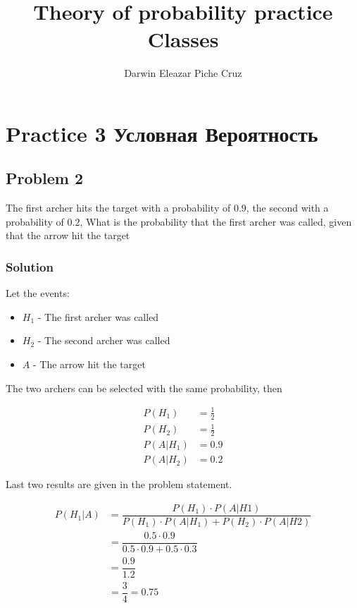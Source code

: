 \documentclass{article}
\title{Theory of probability practice Classes}
\author{Darwin Eleazar Piche Cruz}
\begin{document}
\maketitle

\section*{Practice 3 Условная Вероятность}

\subsection*{Problem 2}

The first archer hits the target with a probability of $0.9$, the second with a probability of $0.2$, What is the probability that the first archer was called, given that the arrow hit the target

\subsubsection*{Solution}

Let the events:

\begin{itemize}
    \item $H_1$ - The first archer was called
    \item $H_2$ - The second archer was called
    \item $A$ - The arrow hit the target
\end{itemize}

The two archers can be selected with the same probability, then

\begin{align*}
    P(H_1) &= \frac{1}{2} \\
    P(H_2) &= \frac{1}{2} \\
    P(A | H_1) &= 0.9 \\
    P(A | H_2) &= 0.2
\end{align*}

Last two results are given in the problem statement.

\begin{align*}
    P(H_1 | A) &= \dfrac{P(H_1)\cdot P(A|H1)}{P(H_1) \cdot P(A | H_1) + P(H_2) \cdot P(A | H2)} \\
    &= \dfrac{0.5 \cdot 0.9}{0.5 \cdot 0.9 + 0.5 \cdot 0.3} \\
    &= \dfrac{0.9}{1.2} \\
    &= \dfrac{3}{4} = 0.75 \\
\end{align*}
\end{document}
